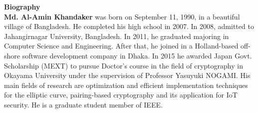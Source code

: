 \newpage
\pagestyle{plain}
\textbf{\huge Biography}
\vspace{10mm}\\

{\bf Md. Al-Amin Khandaker}{ was born on September 11, 1990, in a beautiful village of Bangladesh. He completed his high school in 2007. In 2008, admitted to Jahangirnagar University, Bangladesh. In 2011, he graduated majoring in Computer Science and Engineering. After that, he joined in a Holland-based off-shore software development company in Dhaka. In 2015 he awarded Japan Govt. Scholarship (MEXT) to pursue Doctor’s course in the field of cryptography in Okayama University under the supervision of Professor Yasuyuki NOGAMI. His main fields of research are optimization and efficient implementation techniques for the elliptic curve, pairing-based cryptography and its application for IoT security. He is a graduate student member of IEEE.}
